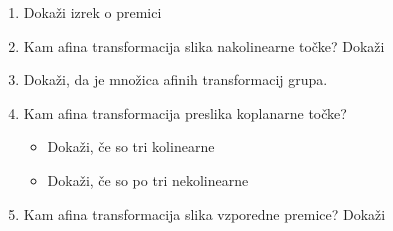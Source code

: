 \documentclass{article}
\begin{document}
\begin{enumerate}
\begin{itemize}
        \end{itemize}
        \item Dokaži izrek o premici
        \item Kam afina transformacija slika nakolinearne točke? Dokaži
        \item Dokaži, da je množica afinih transformacij grupa.
        \item Kam afina transformacija preslika koplanarne točke?
        \begin{itemize}
            \item Dokaži, če so tri kolinearne
            \item Dokaži, če so po tri nekolinearne
        \end{itemize}
        \item Kam afina transformacija slika vzporedne premice? Dokaži
    \end{enumerate}
\end{document}
